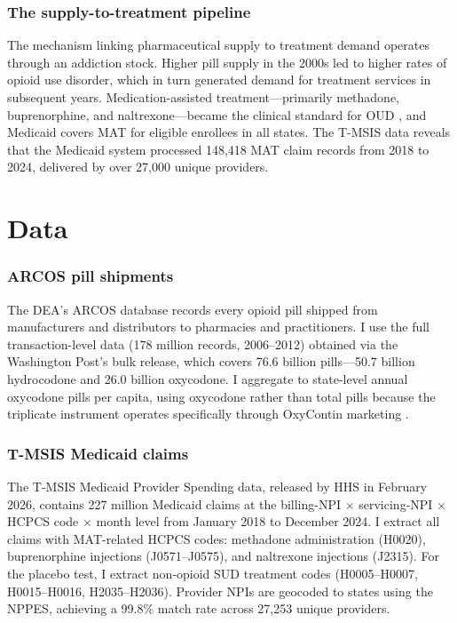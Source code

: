 \documentclass[12pt]{article}
\begin{document}
\subsubsection*{The supply-to-treatment pipeline} The mechanism linking pharmaceutical supply to treatment demand operates through an addiction stock. Higher pill supply in the 2000s led to higher rates of opioid use disorder, which in turn generated demand for treatment services in subsequent years. Medication-assisted treatment---primarily methadone, buprenorphine, and naltrexone---became the clinical standard for OUD \citep{DoleNyswander1965, ConneryMcHugh2015}, and Medicaid covers MAT for eligible enrollees in all states. The T-MSIS data reveals that the Medicaid system processed 148,418 MAT claim records from 2018 to 2024, delivered by over 27,000 unique providers.

\section{Data}

\subsubsection*{ARCOS pill shipments} The DEA's ARCOS database records every opioid pill shipped from manufacturers and distributors to pharmacies and practitioners. I use the full transaction-level data (178 million records, 2006--2012) obtained via the Washington Post's bulk release, which covers 76.6 billion pills---50.7 billion hydrocodone and 26.0 billion oxycodone. I aggregate to state-level annual oxycodone pills per capita, using oxycodone rather than total pills because the triplicate instrument operates specifically through OxyContin marketing \citep{AlpertPowellPacula2022}.

\subsubsection*{T-MSIS Medicaid claims} The T-MSIS Medicaid Provider Spending data, released by HHS in February 2026, contains 227 million Medicaid claims at the billing-NPI $\times$ servicing-NPI $\times$ HCPCS code $\times$ month level from January 2018 to December 2024. I extract all claims with MAT-related HCPCS codes: methadone administration (H0020), buprenorphine injections (J0571--J0575), and naltrexone injections (J2315). For the placebo test, I extract non-opioid SUD treatment codes (H0005--H0007, H0015--H0016, H2035--H2036). Provider NPIs are geocoded to states using the NPPES, achieving a 99.8\% match rate across 27,253 unique providers.
\end{document}
